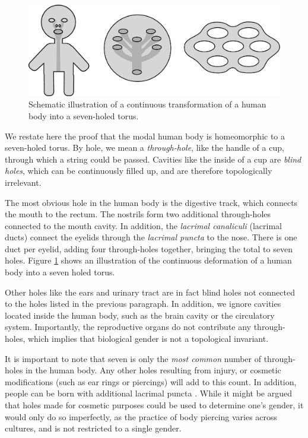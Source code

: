 \documentclass[11pt]{article}
\begin{document}
\begin{figure}
    \centering
    \includegraphics[width=.9\textwidth]{../plots/human-torus.pdf}
    \caption{Schematic illustration of a continuous transformation of a human body into a seven-holed torus.} \label{fig:torus}
\end{figure}

We restate here the proof that the modal human body is homeomorphic to a seven-holed torus. By hole, we mean a \textit{through-hole}, like the handle of a cup, through which a string could be passed. Cavities like the inside of a cup are \textit{blind holes}, which can be continuously filled up, and are therefore topologically irrelevant.

The most obvious hole in the human body is the digestive track, which connects the mouth to the rectum. The nostrils form two additional through-holes connected to the mouth cavity. In addition, the \textit{lacrimal canaliculi} (lacrimal ducts) connect the eyelids through the \textit{lacrimal puncta} to the nose. There is one duct per eyelid, adding four through-holes together, bringing the total to seven holes. Figure \ref{fig:torus} shows an illustration of the continuous deformation of a human body into a seven holed torus.

Other holes like the ears and urinary tract are in fact blind holes not connected to the holes listed in the previous paragraph. In addition, we ignore cavities located inside the human body, such as the brain cavity or the circulatory system. Importantly, the reproductive organs do not contribute any through-holes, which implies that biological gender is not a topological invariant.

It is important to note that seven is only the \textit{most common} number of through-holes in the human body. Any other holes resulting from injury, or cosmetic modifications (such as ear rings or piercings) will add to this count. In addition, people can be born with additional lacrimal puncta \cite{Saleh2021}. While it might be argued that holes made for cosmetic purposes could be used to determine one's gender, it would only do so imperfectly, as the practice of body piercing varies across cultures, and is not restricted to a single gender.
\end{document}
